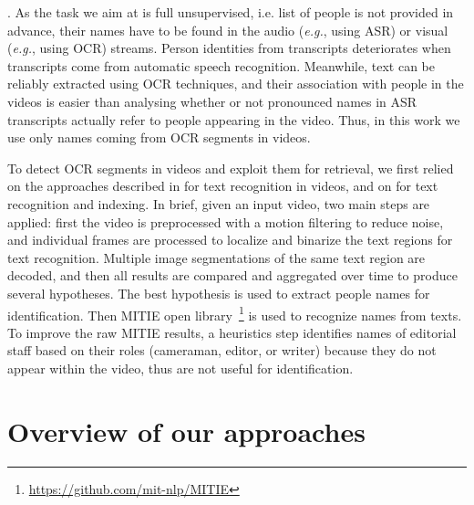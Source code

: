 . As the task we aim at is full unsupervised, i.e. list of people is not provided in advance, their names have to be found in the audio (\emph{e.g.}, using ASR) or visual (\emph{e.g.}, using OCR) streams.
%
%
Person identities from transcripts deteriorates when transcripts come from automatic speech recognition. Meanwhile, text can be reliably extracted using OCR techniques, and their association with people in the videos is easier than analysing whether or not pronounced names in ASR transcripts actually refer to people appearing in the video. Thus, in this work we use only names coming from OCR segments in videos.

To detect OCR segments in videos and exploit them for retrieval, we first relied on the approaches described in \cite{chen-pr04} for text recognition in videos, and on \cite{daddaoua:ICDAR:05} for text recognition and indexing.
%
In brief, given an input video, two main steps are applied: first the video is preprocessed with a motion filtering to reduce noise, and individual frames are processed to localize and binarize the text regions for text recognition.
%
%
Multiple image segmentations of the same text region are decoded, and then all results are compared and aggregated over time to produce several hypotheses. 
%
The best hypothesis is used to extract people names for identification. Then MITIE open library~\footnote{\url{https://github.com/mit-nlp/MITIE}} is used to recognize names from texts. 
%
%
To improve the raw MITIE results, a heuristics step identifies names of editorial staff based on their roles (cameraman, editor, or writer) because they do not appear within the video, thus are not useful for identification.

\section{Overview of our approaches}
\label{sec:overview}

